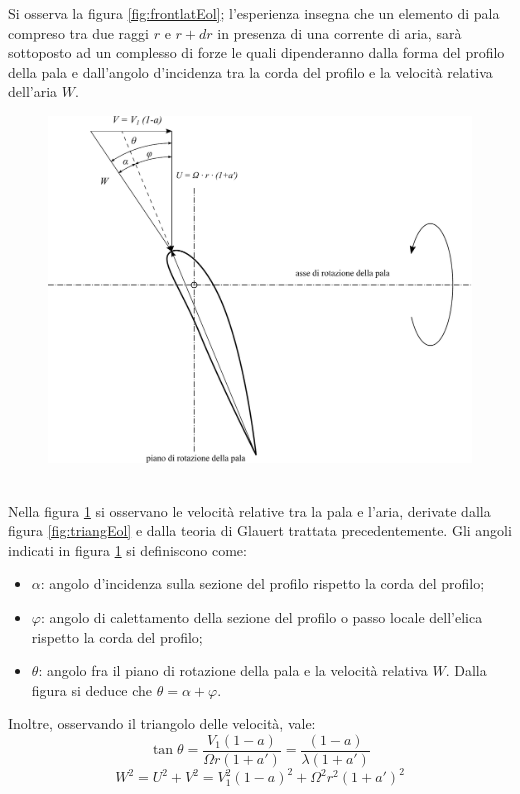 Si osserva la figura \ref{fig:frontlatEol}; l'esperienza insegna che un elemento di pala compreso tra due raggi $r$ e $r+dr$ in presenza di una corrente di aria, sarà sottoposto ad un complesso di forze le quali dipenderanno dalla forma del profilo della pala e dall'angolo d'incidenza tra la corda del profilo e la velocità relativa dell'aria $W$.
\begin{figure}[h!]
\centering
  \includegraphics[width=.7\textwidth]{fig/triangEol2.pdf}
\caption{}
\label{fig:triangEol2}
\end{figure}
\\ Nella figura \ref{fig:triangEol2} si osservano le velocità relative tra la pala e l'aria, derivate dalla figura \ref{fig:triangEol} e dalla teoria di Glauert trattata precedentemente. Gli angoli indicati in figura \ref{fig:triangEol2} si definiscono come:
\begin{itemize}
	\item $\alpha$: angolo d'incidenza sulla sezione del profilo rispetto la corda del profilo;
	\item $\varphi$: angolo di calettamento della sezione del profilo o passo locale dell'elica rispetto la corda del profilo;
	\item $\theta$: angolo fra il piano di rotazione della pala e la velocità relativa $W$. Dalla figura si deduce che $\theta = \alpha + \varphi$.
\end{itemize}
Inoltre, osservando il triangolo delle velocità, vale:
\begin{equation}\label{eq:tantheta}
\tan \theta = \frac{V_1 \left(1-a \right)}{\Omega r \left(1 + a' \right)} = \frac{\left( 1-a \right)}{\lambda \left( 1 + a' \right)}
\end{equation}
\begin{equation}
	W^2 = U^2 + V^2 = V_1^2 \left(1-a \right)^2 + \Omega^2 r^2 \left( 1+ a' \right)^2
\end{equation}

